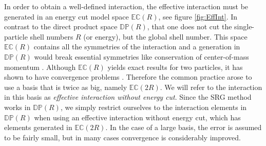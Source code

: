In order to obtain a well-defined interaction, the effective interaction must be generated in an energy cut model space $\mathbb{EC}(R)$, see figure \ref{fig:EffInt}. In contrast to the direct product space $\mathbb{DP}(R)$, that one does not cut the single-particle shell numbers $R$ (or energy), but the global shell number.
This space $\mathbb{EC}(R)$ contains all the symmetries of the interaction and a generation in $\mathbb{DP}(R)$ would break essential symmetries like conservation of center-of-mass momentum \cite{Lohne}. Although $\mathbb{EC}(R)$ yields exact results for two particles, it has shown to have convergence problems \cite{Lohne}. Therefore the common practice arose \cite{Marte,Christoffer,Lohne,Frank} to use a basis that is twice as big, namely $\mathbb{EC}(2R)$. We will refer to the interaction in this basis as  \textit{effective interaction without energy cut}.  
Since the SRG method works in $\mathbb{DP}(R)$, we simply restrict ourselves to the interaction elements  in $\mathbb{DP}(R)$ when using an effective interaction without energy cut, which has elements generated in $\mathbb{EC}(2R)$. In the case of a large basis, the error is assumed to be fairly small, but in many cases convergence is considerably improved.


